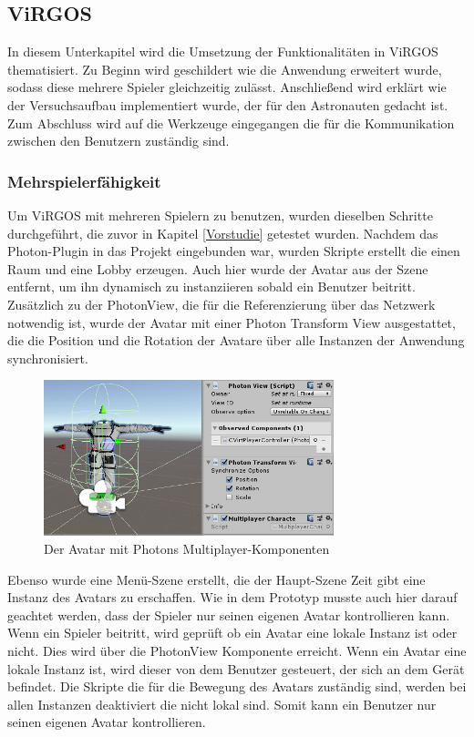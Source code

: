 \subsection{ViRGOS}
In diesem Unterkapitel wird die Umsetzung der Funktionalitäten in ViRGOS thematisiert. Zu Beginn wird geschildert wie die Anwendung erweitert wurde, sodass diese mehrere Spieler gleichzeitig zulässt. Anschließend wird erklärt wie der Versuchsaufbau implementiert wurde, der für den Astronauten gedacht ist. Zum Abschluss wird auf die Werkzeuge eingegangen die für die Kommunikation zwischen den Benutzern zuständig sind. 

\subsubsection{Mehrspielerfähigkeit}
Um ViRGOS mit mehreren Spielern zu benutzen, wurden dieselben Schritte durchgeführt, die zuvor in Kapitel \ref{Vorstudie} getestet wurden. Nachdem das Photon-Plugin in das Projekt eingebunden war, wurden Skripte erstellt die einen Raum und eine Lobby erzeugen. Auch hier wurde der Avatar aus der Szene entfernt, um ihn dynamisch zu instanziieren sobald ein Benutzer beitritt. Zusätzlich zu der PhotonView, die für die Referenzierung über das Netzwerk notwendig ist, wurde der Avatar mit einer Photon Transform View ausgestattet, die die Position und die Rotation der Avatare über alle Instanzen der Anwendung synchronisiert.

\begin{figure}[H]
\centering
\includegraphics[width=0.75\textwidth]{UnityComponents.PNG}
\caption{Der Avatar mit Photons Multiplayer-Komponenten}
\end{figure}

Ebenso wurde eine Menü-Szene erstellt, die der Haupt-Szene Zeit gibt eine Instanz des Avatars zu erschaffen. Wie in dem Prototyp musste auch hier darauf geachtet werden, dass der Spieler nur seinen eigenen Avatar kontrollieren kann. Wenn ein Spieler beitritt, wird geprüft ob ein Avatar eine lokale Instanz ist oder nicht. Dies wird über die PhotonView Komponente erreicht. Wenn ein Avatar eine lokale Instanz ist, wird dieser von dem Benutzer gesteuert, der sich an dem Gerät befindet. Die Skripte die für die Bewegung des Avatars zuständig sind, werden bei allen Instanzen deaktiviert die nicht lokal sind. Somit kann ein Benutzer nur seinen eigenen Avatar kontrollieren.\\

